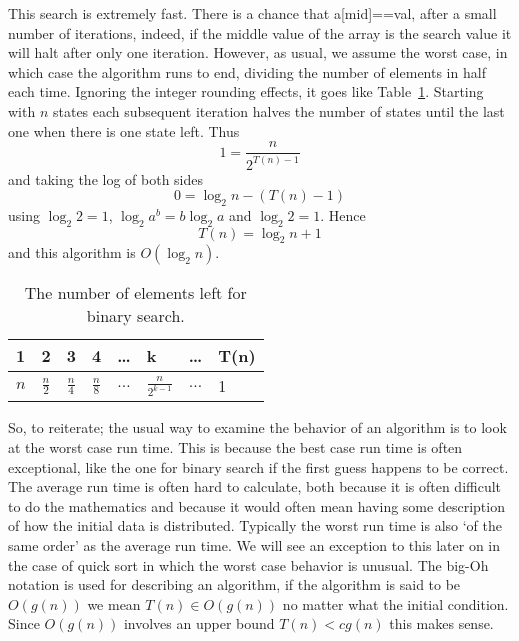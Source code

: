 \documentclass[11pt,a4paper]{scrartcl}
\begin{document}
This search is extremely fast. There is a chance that a[mid]==val,
after a small number of iterations, indeed, if the middle value of the
array is the search value it will halt after only one
iteration. However, as usual, we assume the worst case, in which case
the algorithm runs to end, dividing the number of elements in half
each time. Ignoring the integer rounding effects, it goes like
Table~\ref{tab_binary_search}. Starting with $n$ states each
subsequent iteration halves the number of states until the last one
when there is one state left. Thus
\begin{equation}
1=\frac{n}{2^{T(n)-1}}
\end{equation}
and taking the log of both sides
\begin{equation}
0=\log_2{n}-(T(n)-1)
\end{equation}
using $\log_2{2}=1$, $\log_2{a^b}=b\log_2{a}$ and $\log_2{2}=1$. Hence
\begin{equation}
T(n)=\log_2{n}+1
\end{equation}
and this algorithm is $O(\log_2{n})$.

\begin{table}
\begin{center}
\begin{tabular}{llllllll}
1&2&3&4&\ldots&k&\ldots&T(n)\\
\hline
$n$&$\frac{n}{2}$&$\frac{n}{4}$&$\frac{n}{8}$&$\ldots$&$\frac{n}{2^{k-1}}$&$\ldots$&1
\end{tabular}
\end{center}
\caption{The number of elements left for binary search.\label{tab_binary_search}}
\end{table}


So, to reiterate; the usual way to examine the behavior of an
algorithm is to look at the worst case run time. This is because the
best case run time is often exceptional, like the one for binary
search if the first guess happens to be correct. The average run time
is often hard to calculate, both because it is often difficult to do
the mathematics and because it would often mean having some
description of how the initial data is distributed. Typically the
worst run time is also \lq{}of the same order\rq{} as the average run
time. We will see an exception to this later on in the case of quick
sort in which the worst case behavior is unusual. The big-Oh notation
is used for describing an algorithm, if the algorithm is said to be
$O(g(n))$ we mean $T(n)\in O(g(n))$ no matter what the initial
condition. Since $O(g(n))$ involves an upper bound $T(n)<cg(n)$ this
makes sense.
 
\end{document}
